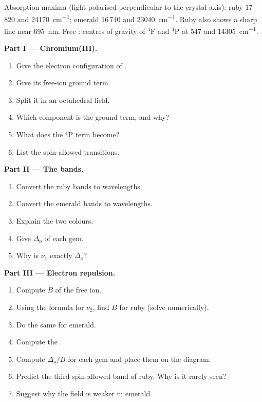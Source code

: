 \begin{problem}
\label{pb:b3:complex-spectra-magnetism:1}
Absorption maxima (light polarised perpendicular to the crystal axis): ruby
17\,820 and \qty{24170}{cm^{-1}}; emerald 16\,740 and \qty{23040}{cm^{-1}}. Ruby also shows a sharp
line near \qty{695}{nm}. Free : centres of gravity of $^4$F and $^4$P at 547 and \qty{14305}{cm^{-1}}.

\medskip\noindent\textbf{Part I --- Chromium(III).}
\begin{enumerate}
  \item Give the electron configuration of .
  \item Give its free-ion ground term.
  \item Split it in an octahedral field.
  \item Which component is the ground term, and why?
  \item What does the $^4$P term become?
  \item List the spin-allowed transitions.
\end{enumerate}

\medskip\noindent\textbf{Part II --- The bands.}
\begin{enumerate}[resume]
  \item Convert the ruby bands to wavelengths.
  \item Convert the emerald bands to wavelengths.
  \item Explain the two colours.
  \item Give $\Delta_{\mathrm o}$ of each gem.
  \item Why is $\nu_1$ exactly $\Delta_{\mathrm o}$?
\end{enumerate}

\medskip\noindent\textbf{Part III --- Electron repulsion.}
\begin{enumerate}[resume]
  \item Compute $B$ of the free ion.
  \item Using the formula for $\nu_2$, find $B$ for ruby (solve numerically).
  \item Do the same for emerald.
  \item Compute the .
  \item Compute $\Delta_{\mathrm o}/B$ for each gem and place them on the diagram.
  \item Predict the third spin-allowed band of ruby. Why is it rarely seen?
  \item Suggest why the field is weaker in emerald.
\end{enumerate}


\end{problem}
